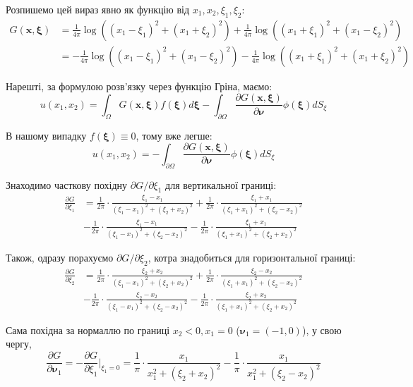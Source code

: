 \documentclass{hw_template}
\begin{document}
Розпишемо цей вираз явно як функцію від $x_1,x_2,\xi_1,\xi_2$:
\begin{align*}
    G(\mathbf{x},\boldsymbol{\xi}) &= \frac{1}{4\pi}\log((x_1-\xi_1)^2+(x_1+\xi_2)^2) + \frac{1}{4\pi}\log((x_1+\xi_1)^2+(x_1-\xi_2)^2) \\
    &= -\frac{1}{4\pi}\log((x_1-\xi_1)^2+(x_1-\xi_2)^2) - \frac{1}{4\pi}\log((x_1+\xi_1)^2+(x_1+\xi_2)^2)
\end{align*}

Нарешті, за формулою розв'язку через функцію Гріна, маємо:
\begin{equation*}
    u(x_1,x_2) = \int_{\Omega}G(\mathbf{x},\boldsymbol{\xi})f(\boldsymbol{\xi})d\boldsymbol{\xi} - \int_{\partial\Omega}\frac{\partial G(\mathbf{x},\boldsymbol{\xi})}{\partial\boldsymbol{\nu}}\phi(\boldsymbol{\xi})dS_{\xi}
\end{equation*}

В нашому випадку $f(\boldsymbol{\xi}) \equiv 0$, тому вже легше: 
\begin{equation*}
    u(x_1,x_2) = -\int_{\partial\Omega}\frac{\partial G(\mathbf{x},\boldsymbol{\xi})}{\partial\boldsymbol{\nu}}\phi(\boldsymbol{\xi})dS_{\xi}
\end{equation*}

Знаходимо часткову похідну $\partial G/\partial \xi_1$ для вертикальної границі:
\begin{align*}
    \frac{\partial G}{\partial \xi_1} &= \frac{1}{2\pi}\cdot \frac{\xi_1-x_1}{(\xi_1-x_1)^2+(\xi_2+x_2)^2} + \frac{1}{2\pi} \cdot \frac{\xi_1+x_1}{(\xi_1+x_1)^2+(\xi_2-x_2)^2} \\
    & -\frac{1}{2\pi}\cdot\frac{\xi_1-x_1}{(\xi_1-x_1)^2+(\xi_2-x_2)^2} - \frac{1}{2\pi}\cdot\frac{\xi_1+x_1}{(\xi_1+x_1)^2+(\xi_2+x_2)^2}
\end{align*}

Також, одразу порахуємо $\partial G/\partial \xi_2$, котра знадобиться для 
горизонтальної границі:
\begin{align*}
    \frac{\partial G}{\partial \xi_2} &= \frac{1}{2\pi}\cdot \frac{\xi_2+x_2}{(\xi_1-x_1)^2+(\xi_2+x_2)^2} + \frac{1}{2\pi} \cdot \frac{\xi_2-x_2}{(\xi_1+x_1)^2+(\xi_2-x_2)^2} \\
    & -\frac{1}{2\pi}\cdot\frac{\xi_2-x_2}{(\xi_1-x_1)^2+(\xi_2-x_2)^2} - \frac{1}{2\pi}\cdot\frac{\xi_2+x_2}{(\xi_1+x_1)^2+(\xi_2+x_2)^2}
\end{align*}

Сама похідна за нормаллю по границі $x_2<0,x_1=0$ ($\boldsymbol{\nu}_1=(-1,0)$), у свою чергу, 
\begin{equation*}
    \frac{\partial G}{\partial \boldsymbol{\nu}_1} = -\frac{\partial G}{\partial \xi_1}\Big|_{\xi_1=0} = \frac{1}{\pi}\cdot\frac{x_1}{x_1^2+(\xi_2+x_2)^2} - \frac{1}{\pi}\cdot\frac{x_1}{x_1^2+(\xi_2-x_2)^2}
\end{equation*}
\end{document}
